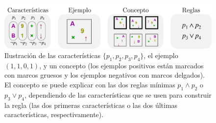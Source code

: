 \begin{figure}
\begin{center}
	\includegraphics[scale=.6]{papers/images_behavior_research_methods/intro_notation_sp.pdf}
\end{center}\caption{Ilustración de las características $\{p_1,p_2,p_3,p_4\}$, el ejemplo $(1,1,0,1)$, y un concepto (los ejemplos positivos están marcados con marcos gruesos y los ejemplos negativos con marcos delgados). El concepto se puede explicar con las dos reglas mínimas $p_1 \land p_2$ o $ p_3 \lor p_4$, dependiendo de las características que se usen para construir la regla (las dos primeras características o las dos últimas características, respectivamente).}
\label{fig:intro_notation}
\end{figure}



